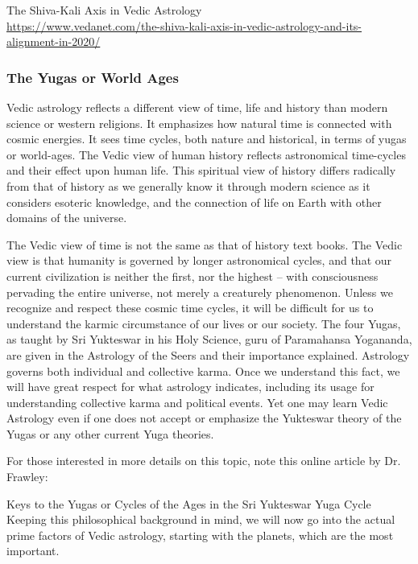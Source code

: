 The Shiva-Kali Axis in Vedic Astrology \\
 \url{https://www.vedanet.com/the-shiva-kali-axis-in-vedic-astrology-and-its-alignment-in-2020/}

\subsubsection{The Yugas or World Ages}
 

Vedic astrology reflects a different view of time, life and history than modern science or western religions. It emphasizes how natural time is connected with cosmic energies. It sees time cycles, both nature and historical, in terms of yugas or world-ages. The Vedic view of human history reflects astronomical time-cycles and their effect upon human life. This spiritual view of history differs radically from that of history as we generally know it through modern science as it considers esoteric knowledge, and the connection of life on Earth with other domains of the universe.

 

The Vedic view of time is not the same as that of history text books. The Vedic view is that humanity is governed by longer astronomical cycles, and that our current civilization is neither the first, nor the highest – with consciousness pervading the entire universe, not merely a creaturely phenomenon. Unless we recognize and respect these cosmic time cycles, it will be difficult for us to understand the karmic circumstance of our lives or our society. The four Yugas, as taught by Sri Yukteswar in his Holy Science, guru of Paramahansa Yogananda, are given in the Astrology of the Seers and their importance explained. Astrology governs both individual and collective karma. Once we understand this fact, we will have great respect for what astrology indicates, including its usage for understanding collective karma and political events. Yet one may learn Vedic Astrology even if one does not accept or emphasize the Yukteswar theory of the Yugas or any other current Yuga theories.

For those interested in more details on this topic, note this online article by Dr. Frawley:

Keys to the Yugas or Cycles of the Ages in the Sri Yukteswar Yuga Cycle
Keeping this philosophical background in mind, we will now go into the actual prime factors of Vedic astrology, starting with the planets, which are the most important.

 

